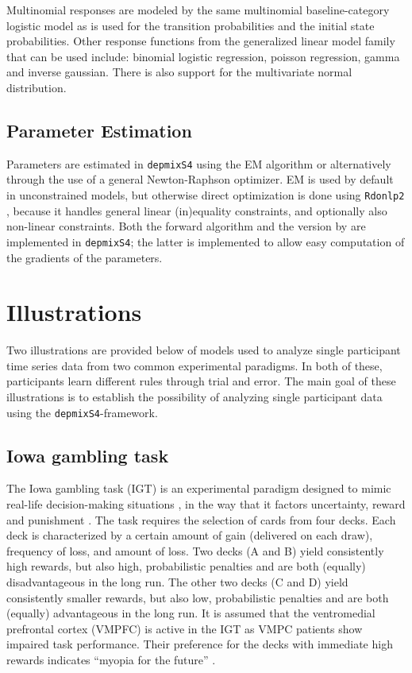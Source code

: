 \documentclass[a4paper,12pt,man]{apa} %
\newcommand{\citep}{\cite}
\newcommand{\citet}{\citeA}
\newcommand{\pkg}{\texttt}
\begin{document}
Multinomial responses are modeled by the same multinomial 
baseline-category logistic model as is used for the transition 
probabilities and the initial state probabilities. Other response 
functions from the generalized linear model family that can be used 
include: binomial logistic regression, poisson regression, gamma and 
inverse gaussian. There is also support for the multivariate normal 
distribution. 


\subsection{Parameter Estimation}

Parameters are estimated in \pkg{depmixS4} using the EM algorithm or
alternatively through the use of a general Newton-Raphson optimizer.
EM is used by default in unconstrained models, but otherwise direct
optimization is done using \pkg{Rdonlp2}
\cite{Tamura2007,Spellucci2002}, because it handles general linear
(in)equality constraints, and optionally also non-linear constraints.
Both the forward algorithm \citep{Baum1966,Rabiner1989} and the
version by \citet{Lystig2002} are implemented in \pkg{depmixS4}; the
latter is implemented to allow easy computation of the gradients of
the parameters.


\section{Illustrations}

Two illustrations are provided below of models used to analyze single
participant time series data from two common experimental paradigms.
In both of these, participants learn different rules through trial and
error.  The main goal of these illustrations is to establish the
possibility of analyzing single participant data using the
\pkg{depmixS4}-framework.

\subsection{Iowa gambling task}

The Iowa gambling task (IGT) is an experimental paradigm designed to
mimic real-life decision-making situations \cite{Bechara1994}, in the
way that it factors uncertainty, reward and punishment
\cite{Dunn2006}.  The task requires the selection of cards from four
decks.  Each deck is characterized by a certain amount of gain
(delivered on each draw), frequency of loss, and amount of loss.  Two
decks (A and B) yield consistently high rewards, but also high,
probabilistic penalties and are both (equally) disadvantageous in the
long run.  The other two decks (C and D) yield consistently smaller
rewards, but also low, probabilistic penalties and are both (equally)
advantageous in the long run.  It is assumed that the ventromedial
prefrontal cortex (VMPFC) is active in the IGT as VMPC patients show
impaired task performance.  Their preference for the decks with
immediate high rewards indicates ``myopia for the future''
\cite{Bechara1994}.
\end{document}
